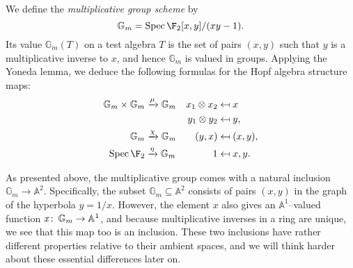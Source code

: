 \begin{example}
We define the \textit{multiplicative group scheme} by \[\mathbb G_m = \Spec \F_2[x, y] / (xy - 1).\]  Its value \(\mathbb G_m(T)\) on a test algebra \(T\) is the set of pairs \((x, y)\) such that \(y\) is a multiplicative inverse to \(x\), and hence \(\mathbb G_m\) is valued in groups.  Applying the Yoneda lemma, we deduce the following formulas for the Hopf algebra structure maps:
\begin{align*}
\mathbb G_m \times \mathbb G_m & \xrightarrow{\mu} \mathbb G_m & x_1 \otimes x_2 & \mapsfrom x \\
& & y_1 \otimes y_2 & \mapsfrom y, \\
\mathbb G_m & \xrightarrow{\chi} \mathbb G_m & (y, x) & \mapsfrom (x, y), \\
\Spec \F_2 & \xrightarrow{\eta} \mathbb G_m & 1 & \mapsfrom x, y.
\end{align*}
\end{example}

\begin{remark}
As presented above, the multiplicative group comes with a natural inclusion \(\mathbb G_m \to \mathbb A^2\).  Specifically, the subset \(\mathbb G_m \subseteq \mathbb A^2\) consists of pairs \((x, y)\) in the graph of the hyperbola \(y = 1/x\).  However, the element \(x\) also gives an \(\mathbb A^1\)--valued function \(x\colon\thinspace \mathbb G_m \to \mathbb A^1\), and because multiplicative inverses in a ring are unique, we see that this map too is an inclusion.  These two inclusions have rather different properties relative to their ambient spaces, and we will think harder about these essential differences later on.
\end{remark}

